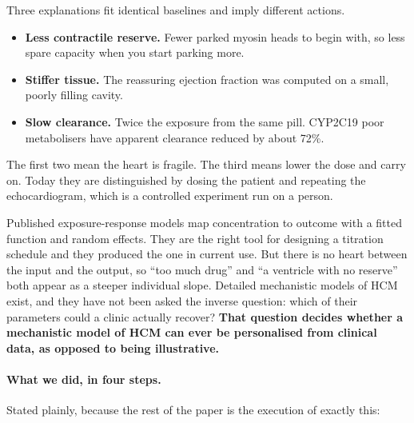 \documentclass[11pt,a4paper]{article}
\newcommand{\claim}[1]{\textcolor{accent}{\textbf{#1}}}
\begin{document}
Three explanations fit identical baselines and imply different actions.

\begin{itemize}
  \item \textbf{Less contractile reserve.} Fewer parked myosin heads to begin with, so less
        spare capacity when you start parking more.
  \item \textbf{Stiffer tissue.} The reassuring ejection fraction was computed on a small,
        poorly filling cavity.
  \item \textbf{Slow clearance.} Twice the exposure from the same pill. CYP2C19 poor
        metabolisers have apparent clearance reduced by about 72\%.
\end{itemize}

The first two mean the heart is fragile. The third means lower the dose and carry on. Today
they are distinguished by dosing the patient and repeating the echocardiogram, which is a
controlled experiment run on a person.

Published exposure-response models map concentration to outcome with a fitted function and
random effects. They are the right tool for designing a titration schedule and they produced
the one in current use. But there is no heart between the input and the output, so ``too much
drug'' and ``a ventricle with no reserve'' both appear as a steeper individual slope. Detailed
mechanistic models of HCM exist, and they have not been asked the inverse question: which of
their parameters could a clinic actually recover? \claim{That question decides whether a
mechanistic model of HCM can ever be personalised from clinical data, as opposed to being
illustrative.}

\paragraph{What we did, in four steps.} Stated plainly, because the rest of the paper is
the execution of exactly this:
\end{document}
